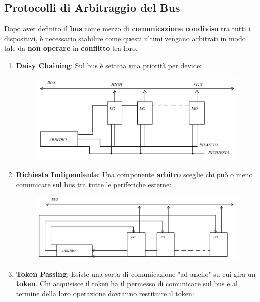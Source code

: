 \documentclass{article}
\begin{document}
\newpage

\subsection{Protocolli di Arbitraggio del Bus}

Dopo aver definito il \textbf{bus} come mezzo di \textbf{comunicazione condiviso} tra tutti i dispositivi, è necessario stabilire come questi ultimi vengano arbitrati in modo tale da \textbf{non operare} in \textbf{conflitto} tra loro.

\vspace*{12px}

\begin{enumerate}
    \item \textbf{Daisy Chaining}: Sul bus è settata una priorità per device:
    \begin{figure}[htbp]
        \center
        \includegraphics[scale=0.325]{img/daisy_chaining.png}
    \end{figure}
    \vspace*{10px}
\item \textbf{Richiesta Indipendente}: Una componente \textbf{arbitro} sceglie chi può o meno comunicare sul bus tra tutte le periferiche esterne:
\begin{figure}[htbp]
        \center
        \includegraphics[scale=0.325]{img/richieste_indipendenti.png}
    \end{figure}
    \vspace*{10px}
\item \textbf{Token Passing}: Esiste una sorta di comunicazione "ad anello" su cui gira un \textbf{token}. Chi acquisisce il token ha il permesso di comunicare sul bus e al termine della loro operazione dovranno restituire il token:

\end{enumerate}
\end{document}
